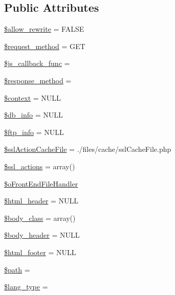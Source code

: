\subsection*{Public Attributes}
\begin{DoxyCompactItemize}
\item 
\hyperlink{classContext_a24355a0c151bd3285c45254f773af275}{\$allow\+\_\+rewrite} = F\+A\+L\+S\+E
\item 
\hyperlink{classContext_a1e80f487f65708456eb17be0024aee50}{\$request\+\_\+method} = \textquotesingle{}G\+E\+T\textquotesingle{}
\item 
\hyperlink{classContext_afddd5e6374a20b88466dfd1cb6f32d62}{\$js\+\_\+callback\+\_\+func} = \textquotesingle{}\textquotesingle{}
\item 
\hyperlink{classContext_a383836fb81ee24d673c7145e4d2eb030}{\$response\+\_\+method} = \textquotesingle{}\textquotesingle{}
\item 
\hyperlink{classContext_a39e9103dacbca5e5fa49d6e93f0ccec3}{\$context} = N\+U\+L\+L
\item 
\hyperlink{classContext_a6f4d307bdcb4bfd83fda27bc265977eb}{\$db\+\_\+info} = N\+U\+L\+L
\item 
\hyperlink{classContext_a8b9cb334c451f773d75db73b01f86ccc}{\$ftp\+\_\+info} = N\+U\+L\+L
\item 
\hyperlink{classContext_a5554b6376a0703ebfbdf2bf79800bfee}{\$ssl\+Action\+Cache\+File} = \textquotesingle{}./files/cache/ssl\+Cache\+File.\+php\textquotesingle{}
\item 
\hyperlink{classContext_a9f8d33aa42d3851da1134d3ba2fbf009}{\$ssl\+\_\+actions} = array()
\item 
\hyperlink{classContext_a55e855769152e53af5e2ecb9b889c7f6}{\$o\+Front\+End\+File\+Handler}
\item 
\hyperlink{classContext_ab0146079ffcc658bbe5bbf4ba7b8e934}{\$html\+\_\+header} = N\+U\+L\+L
\item 
\hyperlink{classContext_af0bb833a3157d6d2153d7858cb60e435}{\$body\+\_\+class} = array()
\item 
\hyperlink{classContext_aa2c90f49a1f6389eadea8962d0fbf5b3}{\$body\+\_\+header} = N\+U\+L\+L
\item 
\hyperlink{classContext_ad55e79b648659c59512e02a6c0d349ff}{\$html\+\_\+footer} = N\+U\+L\+L
\item 
\hyperlink{classContext_a0752e74e1ec01a4fd63c044a1d3bd28b}{\$path} = \textquotesingle{}\textquotesingle{}
\item 
\hyperlink{classContext_a170ac1b95c16b53af329395df9376e9f}{\$lang\+\_\+type} = \textquotesingle{}\textquotesingle{}

\end{DoxyCompactItemize}
